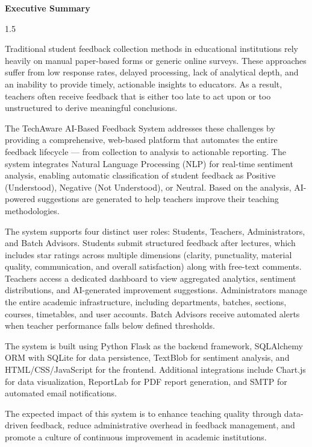 

\newpage
\thispagestyle{plain}


\begin{center}
\textbf{\LARGE Executive Summary}
\end{center}

\vspace{1cm}

\begin{spacing}{1.5}

Traditional student feedback collection methods in educational institutions rely heavily on manual paper-based forms or generic online surveys. These approaches suffer from low response rates, delayed processing, lack of analytical depth, and an inability to provide timely, actionable insights to educators. As a result, teachers often receive feedback that is either too late to act upon or too unstructured to derive meaningful conclusions.

The TechAware AI-Based Feedback System addresses these challenges by providing a comprehensive, web-based platform that automates the entire feedback lifecycle — from collection to analysis to actionable reporting. The system integrates Natural Language Processing (NLP) for real-time sentiment analysis, enabling automatic classification of student feedback as Positive (Understood), Negative (Not Understood), or Neutral. Based on the analysis, AI-powered suggestions are generated to help teachers improve their teaching methodologies.

The system supports four distinct user roles: Students, Teachers, Administrators, and Batch Advisors. Students submit structured feedback after lectures, which includes star ratings across multiple dimensions (clarity, punctuality, material quality, communication, and overall satisfaction) along with free-text comments. Teachers access a dedicated dashboard to view aggregated analytics, sentiment distributions, and AI-generated improvement suggestions. Administrators manage the entire academic infrastructure, including departments, batches, sections, courses, timetables, and user accounts. Batch Advisors receive automated alerts when teacher performance falls below defined thresholds.

The system is built using Python Flask as the backend framework, SQLAlchemy ORM with SQLite for data persistence, TextBlob for sentiment analysis, and HTML/CSS/JavaScript for the frontend. Additional integrations include Chart.js for data visualization, ReportLab for PDF report generation, and SMTP for automated email notifications.

The expected impact of this system is to enhance teaching quality through data-driven feedback, reduce administrative overhead in feedback management, and promote a culture of continuous improvement in academic institutions.

\end{spacing}
\newpage
